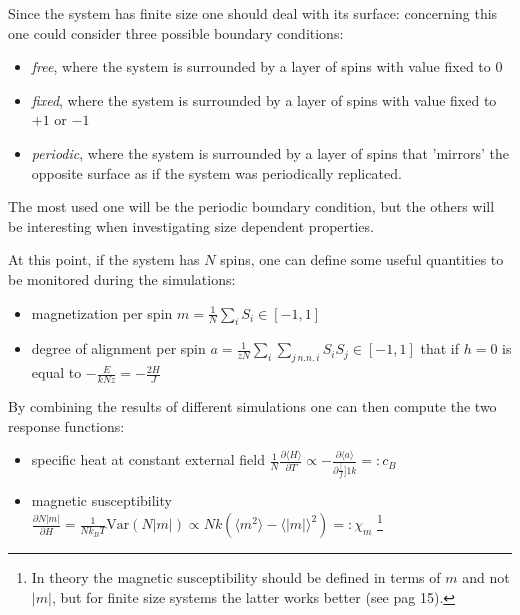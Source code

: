 \documentclass[a4paper, 11pt]{article}
\begin{document}
    Since the system has finite size one should deal with its surface: concerning this one could consider three possible boundary conditions:
    \begin{itemize}
      \item \emph{free}, where the system is surrounded by a layer of spins with value fixed to $0$
      \item \emph{fixed}, where the system is surrounded by a layer of spins with value fixed to $+1$ or $-1$
      \item \emph{periodic}, where the system is surrounded by a layer of spins that 'mirrors' the opposite surface as if the system was periodically replicated.
    \end{itemize}
    The most used one will be the periodic boundary condition, but the others will be interesting when investigating size dependent properties.

    At this point, if the system has $N$ spins, one can define some useful quantities to be monitored during the simulations:
    \begin{itemize}
      \item magnetization per spin $m = \frac{1}{N} \sum_i S_i \in [-1, 1]$
      \item degree of alignment per spin $a = \frac{1}{zN} \sum_i \sum_{j \, n.n. \, i} S_i S_j \in [-1, 1]$ that if $h = 0$ is equal to $-\frac{E}{kNz} = -\frac{2H}{J}$
    \end{itemize}

    By combining the results of different simulations one can then compute the two response functions:
    \begin{itemize}
      \item specific heat at constant external field $\frac{1}{N} \frac{\partial \langle H \rangle }{\partial T} \propto -\frac{\partial \langle a \rangle }{\partial \frac[f]{1}{k}} =: c_B$
      \item magnetic susceptibility $\frac{\partial N|m|}{\partial H} = \frac{1}{Nk_BT} \text{Var}(N|m|) \propto Nk(\langle m^2 \rangle - \langle |m| \rangle^2 ) =: \chi_m$ \footnote{In theory the magnetic susceptibility should be defined in terms of $m$ and not $|m|$, but for finite size systems the latter works better (see \cite{rif:eye-opener} pag 15).}
    \end{itemize}
\end{document}
